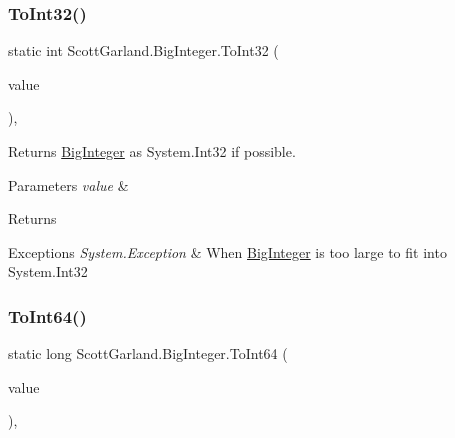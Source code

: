 \subsubsection{\texorpdfstring{To\+Int32()}{ToInt32()}}
{\footnotesize\ttfamily static int Scott\+Garland.\+Big\+Integer.\+To\+Int32 (\begin{DoxyParamCaption}\item[{\hyperlink{class_scott_garland_1_1_big_integer}{Big\+Integer}}]{value }\end{DoxyParamCaption})\hspace{0.3cm}{\ttfamily [inline]}, {\ttfamily [static]}}



Returns \hyperlink{class_scott_garland_1_1_big_integer}{Big\+Integer} as System.\+Int32 if possible. 


\begin{DoxyParams}{Parameters}
{\em value} & \\
\hline
\end{DoxyParams}
\begin{DoxyReturn}{Returns}

\end{DoxyReturn}

\begin{DoxyExceptions}{Exceptions}
{\em System.\+Exception} & When \hyperlink{class_scott_garland_1_1_big_integer}{Big\+Integer} is too large to fit into System.\+Int32\\
\hline
\end{DoxyExceptions}
\mbox{\label{class_scott_garland_1_1_big_integer_ae0fc996dd71a2fb206e03230c1534a6a}} 
\subsubsection{\texorpdfstring{To\+Int64()}{ToInt64()}}
{\footnotesize\ttfamily static long Scott\+Garland.\+Big\+Integer.\+To\+Int64 (\begin{DoxyParamCaption}\item[{\hyperlink{class_scott_garland_1_1_big_integer}{Big\+Integer}}]{value }\end{DoxyParamCaption})\hspace{0.3cm}{\ttfamily [inline]}, {\ttfamily [static]}}



